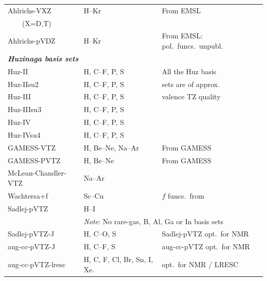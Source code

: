 \begin{longtable}{lll}
Ahlrichs-VXZ & H--Kr & \cite{ashhrajcp97} From EMSL \\
 ~~~~(X=D,T) & & \\
Ahlrichs-pVDZ & H--Kr & \cite{ashhrajcp97} From EMSL: pol.\ funcs.\ unpubl.\\
\hline
%
\multicolumn{3}{l}{\bf{\emph{Huzinaga basis sets}}} \\
Huz-II & H, C--F, P, S & \cite{wkijc19,mswkjcp76,huzinagaintern} All the Huz basis \\
Huz-IIsu2 & H, C--F, P, S & \cite{wkijc19,mswkjcp76,huzinagaintern} sets are of approx.\ \\
Huz-III & H, C--F, P, S & \cite{wkijc19,mswkjcp76,huzinagaintern} valence TZ quality\\
Huz-IIIsu3 & H, C--F, P, S & \cite{wkijc19,mswkjcp76,huzinagaintern}\\
Huz-IV & H, C--F, P, S & \cite{wkijc19,mswkjcp76,huzinagaintern}\\
Huz-IVsu4 & H, C--F, P, S & \cite{wkijc19,mswkjcp76,huzinagaintern}\\
\hline
GAMESS-VTZ & H, Be--Ne, Na--Ar & \cite{thdjcp55,admgscjcp72,ajhwjcp52} From GAMESS \\
GAMESS-PVTZ & H, Be--Ne & \cite{thdjcp55,admgscjcp72,ajhwjcp52} From GAMESS \\
%
McLean-Chandler-VTZ & Na--Ar & \cite{admgscjcp72} \\
Wachtersa+f & Sc--Cu & \cite{ajhwjcp52,wachterintern1969} $f$ funcs.\ from \cite{cwbsrllabjcp91} \\
Sadlej-pVTZ & H--I & \cite{ajstca79,ajsmujmst234,ajstca81,ajstca81-2} \\
  & \multicolumn{2}{l}{\emph{Note}: No rare-gas, B, Al, Ga or In basis sets} \\
%
Sadlej-pVTZ-J & H, C--O, S & \cite{pfpgaaspasjcp115} Sadlej-pVTZ opt.\ for NMR \\
aug-cc-pVTZ-J & H, C--F, S & \cite{pfpgaaspasjcp115} aug-cc-pVTZ opt.\ for NMR \\
aug-cc-pVTZ-lresc & H, C, F, Cl, Br, Sn, I, Xe. & \cite{melomaldojcp12} opt.\ for NMR / LRESC\\


\end{longtable}
